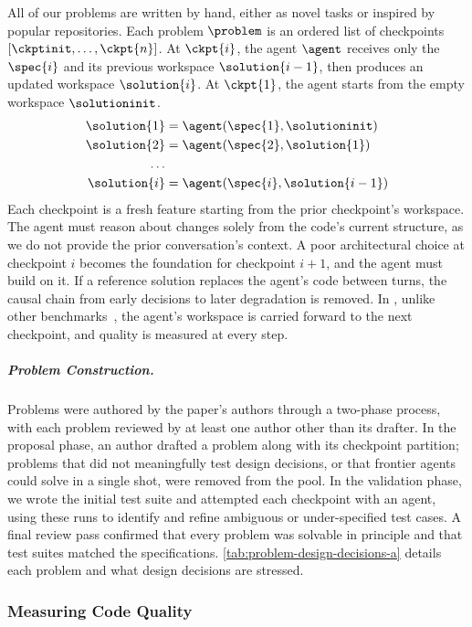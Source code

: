 All of our problems are written by hand, either as novel tasks or inspired by popular repositories. Each problem $\problem$ is an ordered list of checkpoints $[\ckptinit,\ldots,\ckpt{n}]$. At $\ckpt{i}$, the agent $\agent$ receives only the $\spec{i}$ and its previous workspace $\solution{i-1}$, then produces an updated workspace $\solution{i}$. At $\ckpt{1}$, the agent starts from the empty workspace $\solutioninit$.
\begin{equation}\label{eq:problem-setup}
    \begin{aligned}
        \solution{1} &= \agent(\spec{1}, \solutioninit) \\
        \solution{2} &= \agent(\spec{2}, \solution{1})\\
        \ldots \\
        \solution{i} &= \agent(\spec{i}, \solution{i-1})
    \end{aligned}
\end{equation}
Each checkpoint is a fresh feature starting from the prior checkpoint's workspace. The agent must reason about changes solely from the code's current structure, as we do not provide the prior conversation's context. A poor architectural choice at checkpoint $i$ becomes the foundation for checkpoint $i+1$, and the agent must build on it. If a reference solution replaces the agent's code between turns, the causal chain from early decisions to later degradation is removed. In \scb{}, unlike other benchmarks~\citep{codeflowbench, maintaincoder, evoclaw}, the agent's workspace is carried forward to the next checkpoint, and quality is measured at every step.

\subparagraph{Problem Construction.} Problems were authored by the paper's authors through a two-phase process, with each problem reviewed by at least one author other than its drafter. In the proposal phase, an author drafted a problem along with its checkpoint partition; problems that did not meaningfully test design decisions, or that frontier agents could solve in a single shot, were removed from the pool. In the validation phase, we wrote the initial test suite and attempted each checkpoint with an agent, using these runs to identify and refine ambiguous or under-specified test cases. A final review pass confirmed that every problem was solvable in principle and that test suites matched the specifications. \autoref{tab:problem-design-decisions-a} details each problem and what design decisions are stressed.

\subsubsection{Measuring Code Quality}\label{sec:quality-dims}


